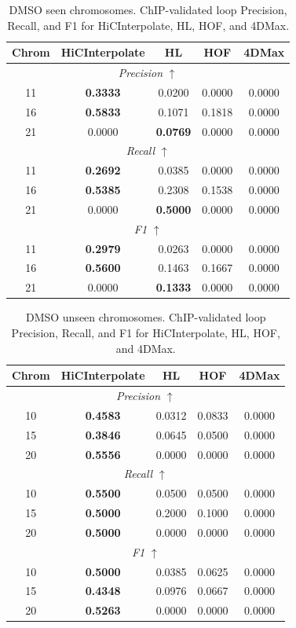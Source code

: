 \begin{table}[!htbp]
\centering
\caption{DMSO seen chromosomes. ChIP-validated loop Precision, Recall, and F1 for HiCInterpolate, HL, HOF, and 4DMax.}
\label{tab:seen_dmso_chip_loops}
\begin{tabular}{|c|c|c|c|c|}
\hline
Chrom & HiCInterpolate & HL & HOF & 4DMax \\
\hline
\multicolumn{5}{|c|}{\textit{Precision} $\uparrow$} \\
\hline
11 & \textbf{0.3333} & 0.0200 & 0.0000 & 0.0000 \\
16 & \textbf{0.5833} & 0.1071 & 0.1818 & 0.0000 \\
21 & 0.0000 & \textbf{0.0769} & 0.0000 & 0.0000 \\
\hline
\multicolumn{5}{|c|}{\textit{Recall} $\uparrow$} \\
\hline
11 & \textbf{0.2692} & 0.0385 & 0.0000 & 0.0000 \\
16 & \textbf{0.5385} & 0.2308 & 0.1538 & 0.0000 \\
21 & 0.0000 & \textbf{0.5000} & 0.0000 & 0.0000 \\
\hline
\multicolumn{5}{|c|}{\textit{F1} $\uparrow$} \\
\hline
11 & \textbf{0.2979} & 0.0263 & 0.0000 & 0.0000 \\
16 & \textbf{0.5600} & 0.1463 & 0.1667 & 0.0000 \\
21 & 0.0000 & \textbf{0.1333} & 0.0000 & 0.0000 \\
\hline
\end{tabular}
\end{table}

\begin{table}[!htbp]
\centering
\caption{DMSO unseen chromosomes. ChIP-validated loop Precision, Recall, and F1 for HiCInterpolate, HL, HOF, and 4DMax.}
\label{tab:unseen_dmso_chip_loops}
\begin{tabular}{|c|c|c|c|c|}
\hline
Chrom & HiCInterpolate & HL & HOF & 4DMax \\
\hline
\multicolumn{5}{|c|}{\textit{Precision} $\uparrow$} \\
\hline
10 & \textbf{0.4583} & 0.0312 & 0.0833 & 0.0000 \\
15 & \textbf{0.3846} & 0.0645 & 0.0500 & 0.0000 \\
20 & \textbf{0.5556} & 0.0000 & 0.0000 & 0.0000 \\
\hline
\multicolumn{5}{|c|}{\textit{Recall} $\uparrow$} \\
\hline
10 & \textbf{0.5500} & 0.0500 & 0.0500 & 0.0000 \\
15 & \textbf{0.5000} & 0.2000 & 0.1000 & 0.0000 \\
20 & \textbf{0.5000} & 0.0000 & 0.0000 & 0.0000 \\
\hline
\multicolumn{5}{|c|}{\textit{F1} $\uparrow$} \\
\hline
10 & \textbf{0.5000} & 0.0385 & 0.0625 & 0.0000 \\
15 & \textbf{0.4348} & 0.0976 & 0.0667 & 0.0000 \\
20 & \textbf{0.5263} & 0.0000 & 0.0000 & 0.0000 \\
\hline
\end{tabular}
\end{table}

